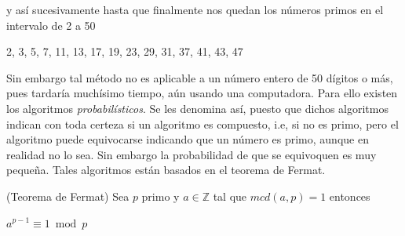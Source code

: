 y as\'i sucesivamente hasta que finalmente nos quedan los n\'umeros primos en 
el intervalo de 2 a 50
\begin{center}
2, 3, 5, 7, 11, 13, 17, 19, 23, 29, 31, 37, 41, 43, 47
\end{center}
 Sin embargo tal m\'etodo no es aplicable a un n\'umero entero de 50 d\'igitos o
 m\'as, pues tardar\'ia much\'isimo tiempo, a\'un usando una computadora. Para ello existen los algoritmos {\it probabil\'isticos}. Se les
denomina as\'i, puesto que dichos algoritmos indican con toda certeza
si un algoritmo es compuesto, i.e, si no 
es primo, pero el algoritmo puede equivocarse indicando que un n\'umero es primo, aunque en realidad no lo
sea. Sin embargo la probabilidad de que se equivoquen es muy peque\~na. Tales algoritmos est\'an basados en 
el teorema de Fermat.

\begin{theorem}(Teorema de Fermat)%
\label{fermat}
Sea $p$ primo y $a \in \mathbb{Z}$ tal que $mcd(a,p)=1$ entonces
\begin{center}
$a^{p-1} \equiv 1 \bmod p$
\end{center}
\end{theorem}

